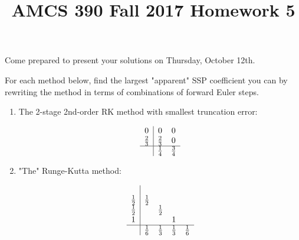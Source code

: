 \documentclass[12pt]{article}
\title{AMCS 390 Fall 2017 Homework 5}
\begin{document}
\date{}
\maketitle

Come prepared to present your solutions on Thursday, October 12th.

For each method below, find the largest "apparent" SSP coefficient you can
by rewriting the method in terms of combinations of forward Euler steps.
\begin{enumerate}

    \item  The 2-stage 2nd-order RK method with smallest truncation error:
    
\begin{align}
\begin{array}{c|cc}
 0 & 0 & 0 \\
\frac{2}{3} & \frac{2}{3} & 0 \\
\hline
 & \frac{1}{4} & \frac{3}{4}\\
\end{array}
\end{align}

    \item  "The" Runge-Kutta method:

    \begin{align}
\begin{array}{c|cccc}
 &  &  &  & \\
\frac{1}{2} & \frac{1}{2} &  &  & \\
\frac{1}{2} &  & \frac{1}{2} &  & \\
1 &  &  & 1 & \\
\hline
 & \frac{1}{6} & \frac{1}{3} & \frac{1}{3} & \frac{1}{6}\\
\end{array}
\end{align}
\end{enumerate}
\end{document}
